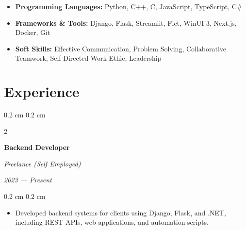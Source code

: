 \documentclass[10pt, a4paper]{article}
\newenvironment{highlights}{
    \begin{itemize}[
        topsep=0.1 cm,
        parsep=0.1 cm,
        partopsep=0pt,
        itemsep=0pt,
        leftmargin=0.4 cm + 10pt
    ]
}{
    \end{itemize}
} %
\newenvironment{onecolentry}{
    \begin{adjustwidth}{
        0.2 cm
    }{
        0.2 cm
    }
}{
    \end{adjustwidth}
} %
\newenvironment{twocolentry}[2][]{
    \onecolentry
    \def\secondColumn{#2}
    \begin{paracol}{2}
}{
    \switchcolumn \raggedleft \secondColumn
    \end{paracol}
    \endonecolentry
} %
\newcommand{\createpointblock}[5]{
    \begin{twocolentry}{
        \textit{#2}

        \textit{#4}}
        \textbf{#1}

        \textit{#3}
    \end{twocolentry}

    \vspace{0.1 cm}
    \begin{onecolentry}
        \begin{highlights}
            #5
        \end{highlights}
    \end{onecolentry}
}
\begin{document}


    \begin{itemize}[itemsep=-1pt]
        \item \textbf{Programming Languages:} Python, C++, C, JavaScript, TypeScript, C\#
        \item \textbf{Frameworks \& Tools:} Django, Flask, Streamlit, Flet, WinUI 3, Next.js, Docker, Git
        \item \textbf{Soft Skills:} Effective Communication, Problem Solving, Collaborative Teamwork, Self-Directed Work Ethic, Leadership
    \end{itemize}


\section{Experience}

    \createpointblock{Backend Developer}{2023 — Present}{Freelance (Self Employed)}{}
    {%
    \item Developed backend systems for clients using Django, Flask, and .NET, including REST APIs, web applications, and automation scripts.
    }
    
\end{document}
